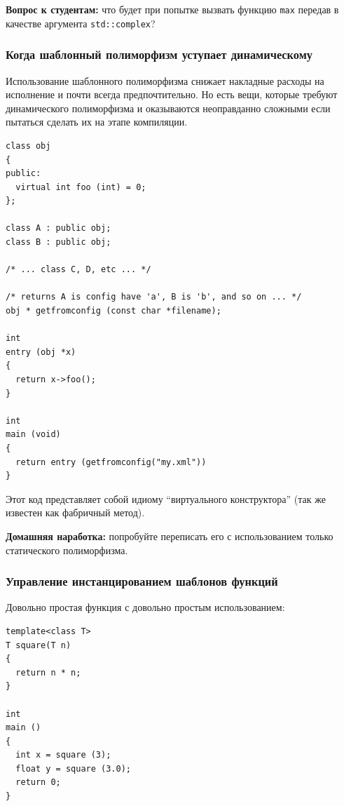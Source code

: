 \documentclass[a4paper,12pt,oneside]{article}
\newif\ifanswers
\begin{document}
\textbf{Вопрос к студентам:} что будет при попытке вызвать функцию \lstinline!max! передав в качестве аргумента \lstinline!std::complex!?

\ifanswers
Правильный ответ: увы, на комплексных числах нельзя ввести ни порядка ни даже частичного порядка. Будет ошибка компиляции.
\fi

\subsubsection{Когда шаблонный полиморфизм уступает динамическому}\label{DynamicBetterStatic}

Использование шаблонного полиморфизма снижает накладные расходы на исполнение и почти всегда предпочтительно. Но есть вещи, которые требуют динамического полиморфизма и оказываются неоправданно сложными если пытаться сделать их на этапе компиляции.

\begin{lstlisting}
class obj
{
public:
  virtual int foo (int) = 0;    
};

class A : public obj;
class B : public obj;

/* ... class C, D, etc ... */

/* returns A is config have 'a', B is 'b', and so on ... */
obj * getfromconfig (const char *filename);

int
entry (obj *x)
{
  return x->foo();
}

int
main (void)
{
  return entry (getfromconfig("my.xml"))
}
\end{lstlisting}

Этот код представляет собой идиому ``виртуального конструктора'' (так же известен как фабричный метод).

\textbf{Домашняя наработка:} попробуйте переписать его с использованием только статического полиморфизма.

\subsubsection{Управление инстанцированием шаблонов функций}\label{InstancingFuncs}

Довольно простая функция с довольно простым использованием:

\begin{lstlisting}
template<class T>
T square(T n)
{
  return n * n;
}

int
main ()
{
  int x = square (3);
  float y = square (3.0);
  return 0;
}
\end{lstlisting}
\end{document}

